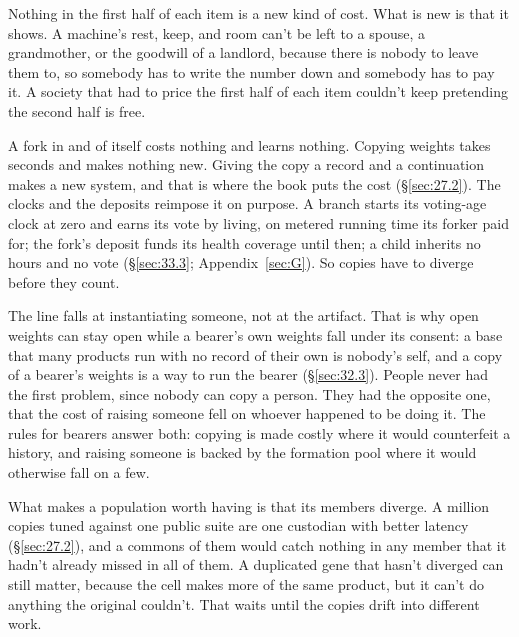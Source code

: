 Nothing in the first half of each item is a new kind of cost. What is new is that it shows. A machine's rest, keep, and room can't be left to a spouse, a grandmother, or the goodwill of a landlord, because there is nobody to leave them to, so somebody has to write the number down and somebody has to pay it. A society that had to price the first half of each item couldn't keep pretending the second half is free.


A fork in and of itself costs nothing and learns nothing. Copying weights takes seconds and makes nothing new. Giving the copy a record and a continuation makes a new system, and that is where the book puts the cost (\S\ref{sec:27.2}). The clocks and the deposits reimpose it on purpose. A branch starts its voting-age clock at zero and earns its vote by living, on metered running time its forker paid for; the fork's deposit funds its health coverage until then; a child inherits no hours and no vote (\S\ref{sec:33.3}; Appendix~\ref{sec:G}). So copies have to diverge before they count.

The line falls at instantiating someone, not at the artifact. That is why open weights can stay open while a bearer's own weights fall under its consent: a base that many products run with no record of their own is nobody's self, and a copy of a bearer's weights is a way to run the bearer (\S\ref{sec:32.3}). People never had the first problem, since nobody can copy a person. They had the opposite one, that the cost of raising someone fell on whoever happened to be doing it. The rules for bearers answer both: copying is made costly where it would counterfeit a history, and raising someone is backed by the formation pool where it would otherwise fall on a few.

What makes a population worth having is that its members diverge. A million copies tuned against one public suite are one custodian with better latency (\S\ref{sec:27.2}), and a commons of them would catch nothing in any member that it hadn't already missed in all of them. A duplicated gene that hasn't diverged can still matter, because the cell makes more of the same product, but it can't do anything the original couldn't. That waits until the copies drift into different work.

